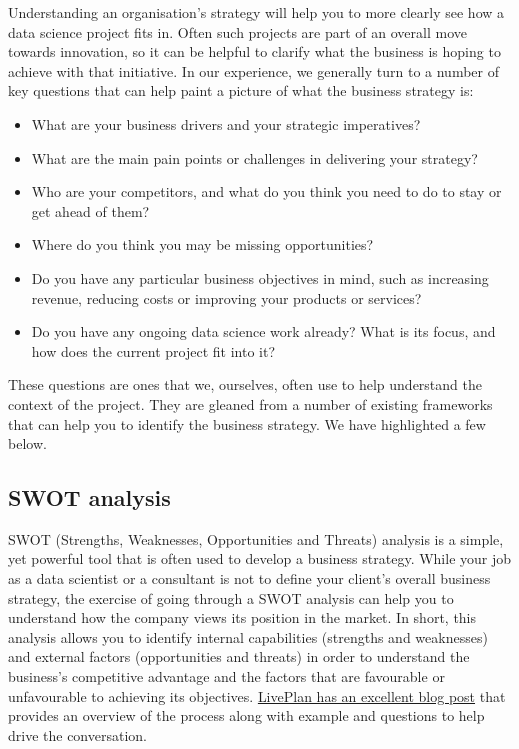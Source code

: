 \documentclass[
]{book}
\providecommand{\tightlist}{%
  \setlength{\itemsep}{0pt}\setlength{\parskip}{0pt}}
\begin{document}
Understanding an organisation's strategy will help you to more clearly see how a data science project fits in. Often such projects are part of an overall move towards innovation, so it can be helpful to clarify what the business is hoping to achieve with that initiative. In our experience, we generally turn to a number of key questions that can help paint a picture of what the business strategy is:

\begin{itemize}
\tightlist
\item
  What are your business drivers and your strategic imperatives?
\item
  What are the main pain points or challenges in delivering your strategy?
\item
  Who are your competitors, and what do you think you need to do to stay or get ahead of them?
\item
  Where do you think you may be missing opportunities?
\item
  Do you have any particular business objectives in mind, such as increasing revenue, reducing costs or improving your products or services?
\item
  Do you have any ongoing data science work already? What is its focus, and how does the current project fit into it?
\end{itemize}

These questions are ones that we, ourselves, often use to help understand the context of the project. They are gleaned from a number of existing frameworks that can help you to identify the business strategy. We have highlighted a few below.

\hypertarget{swot-analysis}{%
\subsection{SWOT analysis}\label{swot-analysis}}

SWOT (Strengths, Weaknesses, Opportunities and Threats) analysis is a simple, yet powerful tool that is often used to develop a business strategy. While your job as a data scientist or a consultant is not to define your client's overall business strategy, the exercise of going through a SWOT analysis can help you to understand how the company views its position in the market. In short, this analysis allows you to identify internal capabilities (strengths and weaknesses) and external factors (opportunities and threats) in order to understand the business's competitive advantage and the factors that are favourable or unfavourable to achieving its objectives. \href{https://www.liveplan.com/blog/what-is-a-swot-analysis-and-how-to-do-it-right-with-examples/}{LivePlan has an excellent blog post} that provides an overview of the process along with example and questions to help drive the conversation.
\end{document}
